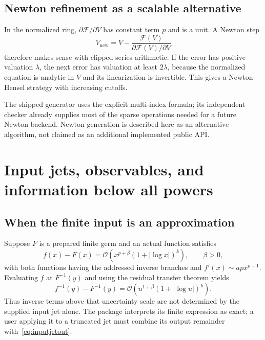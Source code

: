 \documentclass[11pt,a4paper]{article}
\numberwithin{equation}{section}
\theoremstyle{definition}
\theoremstyle{remark}
\newcommand{\OO}{\mathcal O}
\begin{document}
\subsection{Newton refinement as a scalable alternative}

In the normalized ring, $\partial\mathcal F/\partial V$ has constant term
$p$ and is a unit. A Newton step
\[
 V_{\mathrm{new}}=V-
 \frac{\mathcal F(V)}{\partial\mathcal F(V)/\partial V}
\]
therefore makes sense with clipped series arithmetic. If the error has
positive valuation $\lambda$, the next error has valuation at least
$2\lambda$, because the normalized equation is analytic in $V$ and its
linearization is invertible. This gives a Newton--Hensel strategy with
increasing cutoffs.

The shipped generator uses the explicit multi-index formula; its
independent checker already supplies most of the sparse operations needed
for a future Newton backend. Newton generation is described here as an
alternative algorithm, not claimed as an additional implemented public API.

\section{Input jets, observables, and information below all powers}
\label{sec:extensions}

\subsection{When the finite input is an approximation}

Suppose $F$ is a prepared finite germ and an actual function satisfies
\begin{equation}\label{eq:inputjet}
 f(x)-F(x)=\OO\!\left(x^{p+\beta}(1+|\log x|)^k\right),
 \qquad \beta>0,
\end{equation}
with both functions having the addressed inverse branches and
$f'(x)\sim apx^{p-1}$. Evaluating $f$ at $F^{-1}(y)$ and using the residual
transfer theorem yields
\begin{equation}\label{eq:inputjetout}
 f^{-1}(y)-F^{-1}(y)
 =\OO\!\left(u^{1+\beta}(1+|\log u|)^k\right).
\end{equation}
Thus inverse terms above that uncertainty scale are not determined by the
supplied input jet alone. The package interprets its finite expression as
exact; a user applying it to a truncated jet must combine its output
remainder with~\eqref{eq:inputjetout}.
\end{document}
